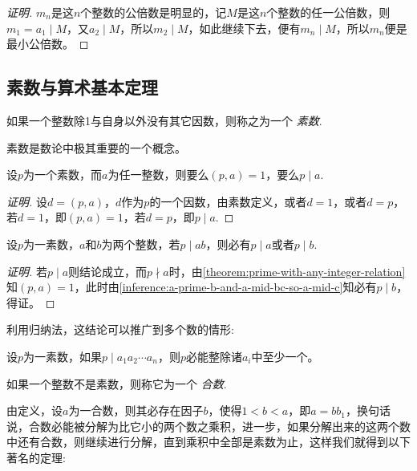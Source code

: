 \begin{proof}[证明]
  $m_n$是这$n$个整数的公倍数是明显的，记$M$是这$n$个整数的任一公倍数，则$m_1 = a_1 \mid M$，又$a_2 \mid M$，所以$m_2 \mid M$，如此继续下去，便有$m_n \mid M$，所以$m_n$便是最小公倍数。
\end{proof}

\subsection{素数与算术基本定理}
\label{sec:prime-number-and-fundamental-theorem-of-arithmetic}

\begin{definition}
  如果一个整数除1与自身以外没有其它因数，则称之为一个 \emph{素数}.
\end{definition}

素数是数论中极其重要的一个概念。

\begin{theorem}
  \label{theorem:prime-with-any-integer-relation}
  设$p$为一个素数，而$a$为任一整数，则要么$(p,a)=1$，要么$p \mid a$.
\end{theorem}

\begin{proof}[证明]
  设$d=(p,a)$，$d$作为$p$的一个因数，由素数定义，或者$d=1$，或者$d=p$，若$d=1$，即$(p,a)=1$，若$d=p$，即$p \mid a$.
\end{proof}

\begin{inference}
  设$p$为一素数，$a$和$b$为两个整数，若$p \mid ab$，则必有$p \mid a$或者$p \mid b$.
\end{inference}

\begin{proof}[证明]
  若$p \mid a$则结论成立，而$p \nmid a$时，由\autoref{theorem:prime-with-any-integer-relation}知$(p,a)=1$，此时由\autoref{inference:a-prime-b-and-a-mid-bc-so-a-mid-c}知必有$p \mid b$，得证。
\end{proof}

利用归纳法，这结论可以推广到多个数的情形:
\begin{inference}
  设$p$为一素数，如果$p \mid a_1a_2\cdots a_n$，则$p$必能整除诸$a_i$中至少一个。
\end{inference}

\begin{definition}
  如果一个整数不是素数，则称它为一个 \emph{合数}.
\end{definition}

由定义，设$a$为一合数，则其必存在因子$b$，使得$1<b<a$，即$a=bb_1$，换句话说，合数必能被分解为比它小的两个数之乘积，进一步，如果分解出来的这两个数中还有合数，则继续进行分解，直到乘积中全部是素数为止，这样我们就得到以下著名的定理:

